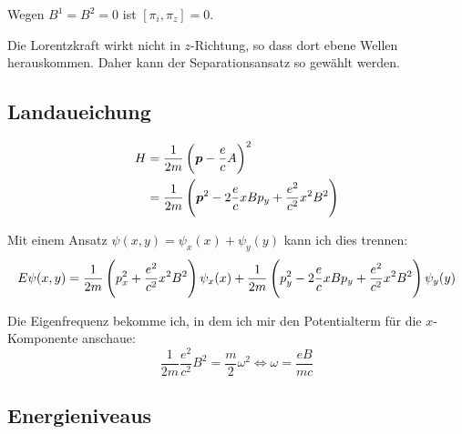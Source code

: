 Wegen $B^1 = B^2 = 0$ ist $[\pi_i, \pi_z] = 0$.

Die Lorentzkraft wirkt nicht in $z$-Richtung, so dass dort ebene Wellen
herauskommen. Daher kann der Separationsansatz so gewählt werden.

\subsection{Landaueichung}

\begin{align*}
	H
	&= \frac1{2m} \del{\vec p - \frac ec A}^2 \\
	&= \frac1{2m} \del{\vec p^2 - 2 \frac ec x B p_y + \frac{e^2}{c^2} x^2 B^2}
\end{align*}

Mit einem Ansatz $\psi(x, y) = \psi_x(x) + \psi_y(y)$ kann ich dies trennen:
\[
	E \psi(x, y) = \frac1{2m} \del{p_x^2 + \frac{e^2}{c^2} x^2 B^2} \psi_x(x) + \frac{1}{2m} \del{p_y^2 - 2 \frac ec x B p_y + \frac{e^2}{c^2} x^2 B^2} \psi_y(y)
\]

\fehlt

Die Eigenfrequenz bekomme ich, in dem ich mir den Potentialterm für die
$x$-Komponente anschaue:
\[
	\frac1{2m} \frac{e^2}{c^2} B^2 = \frac m2 \omega^2
	\iff
	\omega = \frac{eB}{mc}
\]

\subsection{Energieniveaus}

\fehlt


\IfFileExists{\bibliographyfile}{
}{}




